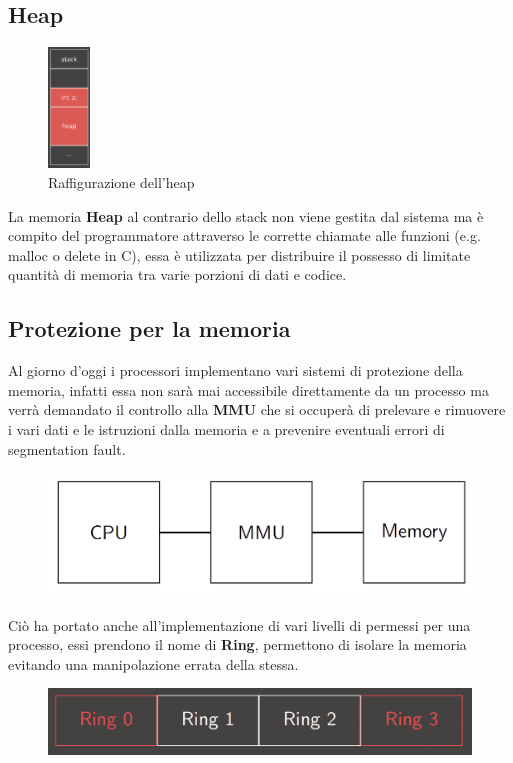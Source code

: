 \subsection{Heap}
\begin{figure}
    \begin{center}
        \includegraphics[width=0.1\textwidth]{res/heap.png}
        \caption{Raffigurazione dell'heap}
    \end{center}
\end{figure}
La memoria \textbf{Heap} al contrario dello stack non viene gestita dal sistema ma è compito del programmatore attraverso le corrette chiamate alle funzioni (e.g. malloc o delete in C), essa è utilizzata per distribuire il possesso di limitate quantità di memoria tra varie porzioni di dati e codice.

\clearpage
\subsection{Protezione per la memoria}
Al giorno d'oggi i processori implementano vari sistemi di protezione della memoria, infatti essa non sarà mai accessibile direttamente da un processo ma verrà demandato il controllo alla \textbf{MMU} che si occuperà di prelevare e rimuovere i vari dati e le istruzioni dalla memoria e a prevenire eventuali errori di segmentation fault.
\begin{figure}[h!]
    \centering
    \includegraphics[width=.4\linewidth]{res/MMU.png}
    \caption{}
\end{figure}

Ciò ha portato anche all'implementazione di vari livelli di permessi per una processo, essi prendono il nome di \textbf{Ring}, permettono di isolare la memoria evitando una manipolazione errata della stessa.
\begin{figure}[h!]
    \centering
    \includegraphics[width=.5\linewidth]{res/Ring.png}
    \caption{}
\end{figure}

